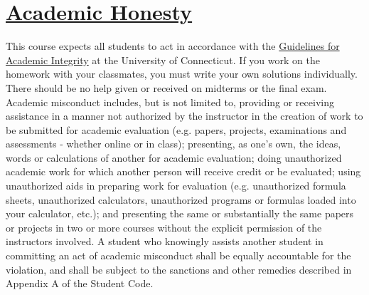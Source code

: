 \documentclass[11pt]{article}
\begin{document}
\section*{\underline{Academic Honesty}}
This course expects all students to act in accordance with the \href{http://community.uconn.edu/the-student-code-appendix-a/}{Guidelines for Academic Integrity} at the University of Connecticut.  If you work on the homework with your classmates, you must write your own solutions individually. There should be no help given or received on midterms or the final exam. Academic misconduct includes, but is not limited to, providing or receiving assistance in a manner not authorized by the instructor in the creation of work to be submitted for academic evaluation (e.g. papers, projects, examinations and assessments - whether online or in class); presenting, as one's own, the ideas, words or calculations of another for academic evaluation; doing unauthorized academic work for which another person will receive credit or be evaluated; using unauthorized aids in preparing work for evaluation (e.g. unauthorized formula sheets, unauthorized calculators, unauthorized programs or formulas loaded into your calculator, etc.); and presenting the same or substantially the same papers or projects in two or more courses without the explicit permission of the instructors involved. A student who knowingly assists another student in committing an act of academic misconduct shall be equally accountable for the violation, and shall be subject to the sanctions and other remedies described in Appendix A of the Student Code. 
\end{document}
